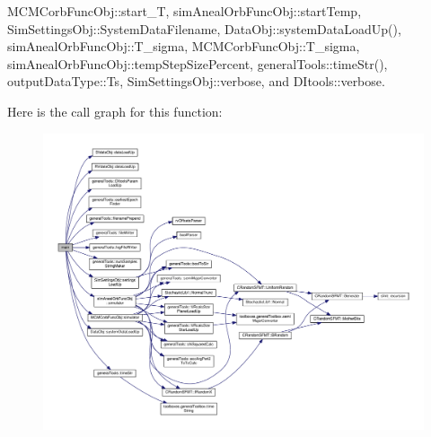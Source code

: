 M\-C\-M\-Corb\-Func\-Obj\-::start\-\_\-\-T, sim\-Aneal\-Orb\-Func\-Obj\-::start\-Temp, Sim\-Settings\-Obj\-::\-System\-Data\-Filename, Data\-Obj\-::system\-Data\-Load\-Up(), sim\-Aneal\-Orb\-Func\-Obj\-::\-T\-\_\-sigma, M\-C\-M\-Corb\-Func\-Obj\-::\-T\-\_\-sigma, sim\-Aneal\-Orb\-Func\-Obj\-::temp\-Step\-Size\-Percent, general\-Tools\-::time\-Str(), output\-Data\-Type\-::\-Ts, Sim\-Settings\-Obj\-::verbose, and D\-Itools\-::verbose.



Here is the call graph for this function\-:
\nopagebreak
\begin{figure}[H]
\begin{center}
\leavevmode
\includegraphics[width=350pt]{looped___m_c_m_corb_simulator_8cpp_a0ddf1224851353fc92bfbff6f499fa97_cgraph}
\end{center}
\end{figure}


